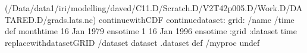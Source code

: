 \begin{ingrid}
(/Data/data1/iri/modelling/daved/C11.D/Scratch.D/V2T42p005.D/Work.D/DATARED.D/grads.lats.nc) continuewithCDF
continuedataset: 
grid:
/name /time def
monthtime
16 Jan 1979 ensotime
1
16 Jan 1996 ensotime
:grid
:dataset
time replacewithdatasetGRID
/dataset dataset .dataset def
/myproc undef
\end{ingrid}
